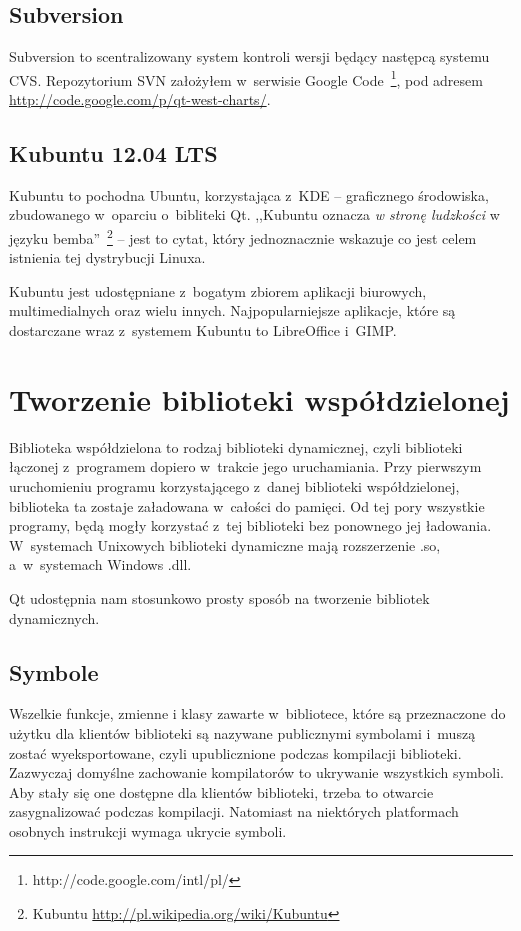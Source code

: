 \subsection{Subversion}
Subversion to scentralizowany system kontroli wersji będący następcą systemu CVS. Repozytorium SVN założyłem w~serwisie Google Code~\footnote{http://code.google.com/intl/pl/}, pod adresem \url{http://code.google.com/p/qt-west-charts/}.

\subsection{Kubuntu 12.04 LTS}
Kubuntu to pochodna Ubuntu, korzystająca z~KDE -- graficznego środowiska, zbudowanego w~oparciu o~bibliteki Qt. ,,Kubuntu oznacza \textit{w stronę ludzkości} w języku bemba''~\footnote{Kubuntu \url{http://pl.wikipedia.org/wiki/Kubuntu}} -- jest to cytat, który jednoznacznie wskazuje co jest celem istnienia tej dystrybucji Linuxa.

Kubuntu jest udostępniane z~bogatym zbiorem aplikacji biurowych, multimedialnych oraz wielu innych. Najpopularniejsze aplikacje, które są dostarczane wraz z~systemem Kubuntu to LibreOffice i~GIMP. 

\section{Tworzenie biblioteki współdzielonej}
Biblioteka współdzielona to rodzaj biblioteki dynamicznej, czyli biblioteki łączonej z~programem dopiero w~trakcie jego uruchamiania. Przy pierwszym uruchomieniu programu korzystającego z~danej biblioteki współdzielonej, biblioteka ta zostaje załadowana w~całości do pamięci. Od tej pory wszystkie programy, będą mogły korzystać z~tej biblioteki bez ponownego jej ładowania. W~systemach Unixowych biblioteki dynamiczne mają rozszerzenie .so, a~w~systemach Windows .dll.

Qt udostępnia nam stosunkowo prosty sposób na tworzenie bibliotek dynamicznych.

\subsection{Symbole}
Wszelkie funkcje, zmienne i klasy zawarte w~bibliotece, które są przeznaczone do użytku dla klientów biblioteki są nazywane publicznymi symbolami i~muszą zostać wyeksportowane, czyli upublicznione podczas kompilacji biblioteki. Zazwyczaj domyślne zachowanie kompilatorów to ukrywanie wszystkich symboli. Aby stały się one dostępne dla klientów biblioteki, trzeba to otwarcie zasygnalizować podczas kompilacji. Natomiast na niektórych platformach osobnych instrukcji wymaga ukrycie symboli.


